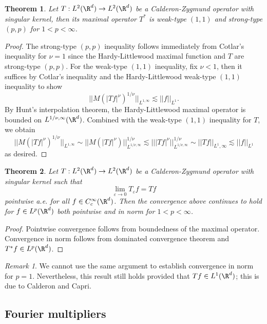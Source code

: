 \documentclass[reqno]{amsart}
\newtheorem{theorem}{Theorem}
\theoremstyle{definition}
\theoremstyle{remark}
\newtheorem*{remark}{Remark}
\renewcommand{\epsilon}{\varepsilon}
\begin{document}
\begin{theorem}
	Let $T: L^2 (\R^d) \to L^2 (\R^d)$ be a Calderon-Zygmund operator with singular kernel, then its maximal operator $T^*$ is weak-type $(1, 1)$ and strong-type $(p, p)$ for $1 < p < \infty$. 
\end{theorem}

\begin{proof}
	The strong-type $(p, p)$ inequality follows immediately from Cotlar's inequality for $\nu = 1$ since the Hardy-Littlewood maximal function and $T$ are strong-type $(p, p)$. 	For the weak-type $(1, 1)$ inequality, fix $\nu < 1$, then it suffices by Cotlar's inequality and the Hardy-Littlewood weak-type $(1, 1)$ inequality to show
		\[  ||M(|Tf|^\nu)^{1/\nu} ||_{L^{1, \infty}} \lesssim ||f||_{L^1}. \]
	By Hunt's interpolation theorem, the Hardy-Littlewood maximal operator	is bounded on $L^{1/\nu, \infty} (\R^d)$. Combined with the weak-type $(1, 1)$ inequality for $T$, we obtain
		\[ ||M(|Tf|^\nu)^{1/\nu} ||_{L^{1, \infty}} \sim ||M (|Tf|^\nu)||_{L^{1/\nu, \infty}}^{1/\nu} \lesssim |||Tf|^\nu||_{L^{1/\nu, \infty}}^{1/\nu} \sim ||Tf||_{L^1, \infty} \lesssim ||f||_{L^1} \]
	as desired. 
\end{proof}

\begin{theorem}
	Let $T: L^2 (\R^d) \to L^2 (\R^d)$ be a Calderon-Zygmund operator with singular kernel such that 
		\[ \lim_{\epsilon \to 0} T_\epsilon f = Tf \]
	pointwise a.e. for all $f \in C^\infty_c (\R^d)$. Then the convergence above continues to hold for $f \in L^p (\R^d)$ both pointwise and in norm for $1 < p < \infty$. 
\end{theorem}

\begin{proof}
	Pointwise convergence follows from boundedness of the maximal operator. Convergence in norm follows from dominated convergence theorem and $T^* f \in L^p (\R^d)$. 
\end{proof}

\begin{remark}
	We cannot use the same argument to establish convergence in norm for $p = 1$. Nevertheless, this result still holds provided that $Tf \in L^1 (\R^d)$; this is due to Calderon and Capri. 
\end{remark}

\subsection{Fourier multipliers}
\end{document}
